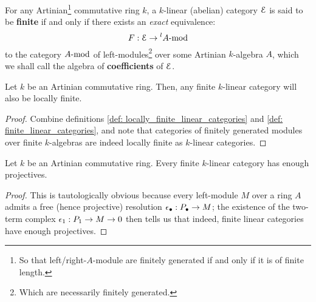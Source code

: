             \begin{definition} \label{def: finite_linear_categories}
                For any Artinian\footnote{So that left/right-$A$-module are finitely generated if and only if it is of finite length.} commutative ring $k$, a $k$-linear (abelian) category $\E$ is said to be \textbf{finite} if and only if there exists an \textit{exact} equivalence:
                    $$F: \E \to {}^lA\mod$$
                to the category $A\mod$ of left-modules\footnote{Which are necessarily finitely generated.} over some Artinian $k$-algebra $A$, which we shall call the algebra of \textbf{coefficients} of $\E$.
            \end{definition}
            \begin{proposition} \label{prop: finite_linear_categories_are_locally_finite}
                Let $k$ be an Artinian commutative ring. Then, any finite $k$-linear category will also be locally finite. 
            \end{proposition}
                \begin{proof}
                    Combine definitions \ref{def: locally_finite_linear_categories} and \ref{def: finite_linear_categories}, and note that categories of finitely generated modules over finite $k$-algebras are indeed locally finite as $k$-linear categories. 
                \end{proof}
            \begin{proposition} \label{prop: finite_linear_categories_have_enough_projectives}
                Let $k$ be an Artinian commutative ring. Every finite $k$-linear category has enough projectives.
            \end{proposition}
                \begin{proof}
                    This is tautologically obvious because every left-module $M$ over a ring $A$ admits a free (hence projective) resolution $\e_{\bullet}: P_{\bullet} \to M$; the existence of the two-term complex $\e_1: P_1 \to M \to 0$ then tells us that indeed, finite linear categories have enough projectives. 
                \end{proof}
            
